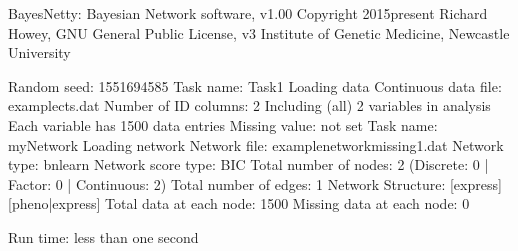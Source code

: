 \documentclass[letterpaper,10pt,english]{sphinxmanual}
\begin{document}
\begin{sphinxVerbatim}[commandchars=\\\{\}]
BayesNetty: Bayesian Network software, v1.00
\PYGZhy{}\PYGZhy{}\PYGZhy{}\PYGZhy{}\PYGZhy{}\PYGZhy{}\PYGZhy{}\PYGZhy{}\PYGZhy{}\PYGZhy{}\PYGZhy{}\PYGZhy{}\PYGZhy{}\PYGZhy{}\PYGZhy{}\PYGZhy{}\PYGZhy{}\PYGZhy{}\PYGZhy{}\PYGZhy{}\PYGZhy{}\PYGZhy{}\PYGZhy{}\PYGZhy{}\PYGZhy{}\PYGZhy{}\PYGZhy{}\PYGZhy{}\PYGZhy{}\PYGZhy{}\PYGZhy{}\PYGZhy{}\PYGZhy{}\PYGZhy{}\PYGZhy{}\PYGZhy{}\PYGZhy{}\PYGZhy{}\PYGZhy{}\PYGZhy{}\PYGZhy{}\PYGZhy{}\PYGZhy{}\PYGZhy{}\PYGZhy{}\PYGZhy{}\PYGZhy{}\PYGZhy{}\PYGZhy{}\PYGZhy{}
Copyright 2015\PYGZhy{}present Richard Howey, GNU General Public License, v3
Institute of Genetic Medicine, Newcastle University

Random seed: 1551694585
\PYGZhy{}\PYGZhy{}\PYGZhy{}\PYGZhy{}\PYGZhy{}\PYGZhy{}\PYGZhy{}\PYGZhy{}\PYGZhy{}\PYGZhy{}\PYGZhy{}\PYGZhy{}\PYGZhy{}\PYGZhy{}\PYGZhy{}\PYGZhy{}\PYGZhy{}\PYGZhy{}\PYGZhy{}\PYGZhy{}\PYGZhy{}\PYGZhy{}\PYGZhy{}\PYGZhy{}\PYGZhy{}\PYGZhy{}\PYGZhy{}\PYGZhy{}\PYGZhy{}\PYGZhy{}\PYGZhy{}\PYGZhy{}\PYGZhy{}\PYGZhy{}\PYGZhy{}\PYGZhy{}\PYGZhy{}\PYGZhy{}\PYGZhy{}\PYGZhy{}\PYGZhy{}\PYGZhy{}\PYGZhy{}\PYGZhy{}\PYGZhy{}\PYGZhy{}\PYGZhy{}\PYGZhy{}\PYGZhy{}\PYGZhy{}
Task name: Task\PYGZhy{}1
Loading data
Continuous data file: example\PYGZhy{}cts.dat
Number of ID columns: 2
Including (all) 2 variables in analysis
Each variable has 1500 data entries
Missing value: not set
\PYGZhy{}\PYGZhy{}\PYGZhy{}\PYGZhy{}\PYGZhy{}\PYGZhy{}\PYGZhy{}\PYGZhy{}\PYGZhy{}\PYGZhy{}\PYGZhy{}\PYGZhy{}\PYGZhy{}\PYGZhy{}\PYGZhy{}\PYGZhy{}\PYGZhy{}\PYGZhy{}\PYGZhy{}\PYGZhy{}\PYGZhy{}\PYGZhy{}\PYGZhy{}\PYGZhy{}\PYGZhy{}\PYGZhy{}\PYGZhy{}\PYGZhy{}\PYGZhy{}\PYGZhy{}\PYGZhy{}\PYGZhy{}\PYGZhy{}\PYGZhy{}\PYGZhy{}\PYGZhy{}\PYGZhy{}\PYGZhy{}\PYGZhy{}\PYGZhy{}\PYGZhy{}\PYGZhy{}\PYGZhy{}\PYGZhy{}\PYGZhy{}\PYGZhy{}\PYGZhy{}\PYGZhy{}\PYGZhy{}\PYGZhy{}
\PYGZhy{}\PYGZhy{}\PYGZhy{}\PYGZhy{}\PYGZhy{}\PYGZhy{}\PYGZhy{}\PYGZhy{}\PYGZhy{}\PYGZhy{}\PYGZhy{}\PYGZhy{}\PYGZhy{}\PYGZhy{}\PYGZhy{}\PYGZhy{}\PYGZhy{}\PYGZhy{}\PYGZhy{}\PYGZhy{}\PYGZhy{}\PYGZhy{}\PYGZhy{}\PYGZhy{}\PYGZhy{}\PYGZhy{}\PYGZhy{}\PYGZhy{}\PYGZhy{}\PYGZhy{}\PYGZhy{}\PYGZhy{}\PYGZhy{}\PYGZhy{}\PYGZhy{}\PYGZhy{}\PYGZhy{}\PYGZhy{}\PYGZhy{}\PYGZhy{}\PYGZhy{}\PYGZhy{}\PYGZhy{}\PYGZhy{}\PYGZhy{}\PYGZhy{}\PYGZhy{}\PYGZhy{}\PYGZhy{}\PYGZhy{}
Task name: myNetwork
Loading network
Network file: example\PYGZhy{}network\PYGZhy{}missing1.dat
Network type: bnlearn
Network score type: BIC
Total number of nodes: 2 (Discrete: 0 | Factor: 0 | Continuous: 2)
Total number of edges: 1
Network Structure: [express][pheno|express]
Total data at each node: 1500
Missing data at each node: 0
\PYGZhy{}\PYGZhy{}\PYGZhy{}\PYGZhy{}\PYGZhy{}\PYGZhy{}\PYGZhy{}\PYGZhy{}\PYGZhy{}\PYGZhy{}\PYGZhy{}\PYGZhy{}\PYGZhy{}\PYGZhy{}\PYGZhy{}\PYGZhy{}\PYGZhy{}\PYGZhy{}\PYGZhy{}\PYGZhy{}\PYGZhy{}\PYGZhy{}\PYGZhy{}\PYGZhy{}\PYGZhy{}\PYGZhy{}\PYGZhy{}\PYGZhy{}\PYGZhy{}\PYGZhy{}\PYGZhy{}\PYGZhy{}\PYGZhy{}\PYGZhy{}\PYGZhy{}\PYGZhy{}\PYGZhy{}\PYGZhy{}\PYGZhy{}\PYGZhy{}\PYGZhy{}\PYGZhy{}\PYGZhy{}\PYGZhy{}\PYGZhy{}\PYGZhy{}\PYGZhy{}\PYGZhy{}\PYGZhy{}\PYGZhy{}

Run time: less than one second
\end{sphinxVerbatim}
\end{document}

